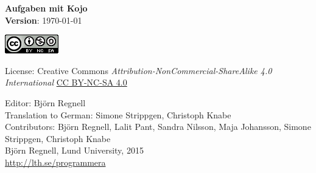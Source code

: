 { \vspace{250mm}\fontsize{11}{11}\flushleft\selectfont 
\vspace*{\fill}

\begin{center}
\Huge {\bf Aufgaben mit Kojo}\\
\Large {\bf Version}: \today{ }
\end{center}
\vskip7cm

\large
\includegraphics{../img/cc.png}

License: Creative Commons {\it Attribution-NonCommercial-ShareAlike 4.0 International} 
\href{http://creativecommons.org/licenses/by-nc-sa/4.0/}{CC BY-NC-SA 4.0}

Editor: Björn Regnell\\
Translation to German: Simone Strippgen, Christoph Knabe\\
Contributors: Björn Regnell, Lalit Pant, Sandra Nilsson, Maja Johansson, Simone Strippgen, Christoph Knabe\\
\textcopyright{ }Björn Regnell, Lund University, 2015 \\
\url{http://lth.se/programmera}
}